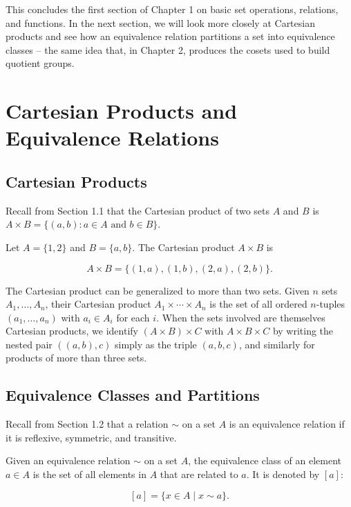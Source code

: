 This concludes the first section of Chapter 1 on basic set operations, relations, and functions. In the next section, we will look more closely at Cartesian products and see how an equivalence relation partitions a set into equivalence classes -- the same idea that, in Chapter 2, produces the cosets used to build quotient groups.


\section{Cartesian Products and Equivalence Relations}

\subsection{Cartesian Products}

Recall from Section 1.1 that the Cartesian product of two sets $A$ and $B$ is $A \times B = \{(a,b) : a \in A \text{ and } b \in B\}$.

\begin{example}

Let $A = \{1, 2\}$ and $B = \{a, b\}$. The Cartesian product $A \times B$ is

\[
A \times B = \{(1, a), (1, b), (2, a), (2, b)\}.
\]

\end{example}

The Cartesian product can be generalized to more than two sets. Given $n$ sets $A_1, \dots, A_n$, their Cartesian product $A_1 \times \cdots \times A_n$ is the set of all ordered $n$-tuples $(a_1, \dots, a_n)$ with $a_i \in A_i$ for each $i$. When the sets involved are themselves Cartesian products, we identify $(A \times B) \times C$ with $A \times B \times C$ by writing the nested pair $((a,b),c)$ simply as the triple $(a,b,c)$, and similarly for products of more than three sets.

\subsection{Equivalence Classes and Partitions}

Recall from Section 1.2 that a relation $\sim$ on a set $A$ is an equivalence relation if it is reflexive, symmetric, and transitive.

\begin{definition}
Given an equivalence relation $\sim$ on a set $A$, the equivalence class of an element $a \in A$ is the set of all elements in $A$ that are related to $a$. It is denoted by $[a]$:

\[
[a] = \{x \in A \mid x \sim a\}.
\]
\end{definition}

